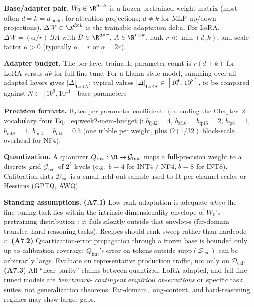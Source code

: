 \begin{notationbox}
\textbf{Base/adapter pair.}
$W_0 \in \R^{d \times k}$ is a frozen pretrained weight matrix (most
often $d = k = d_{\mathrm{model}}$ for attention projections; $d \ne
k$ for MLP up/down projections). $\Delta W \in \R^{d \times k}$ is
the trainable adaptation delta. For LoRA,
$\Delta W = (\alpha/r)\,B A$ with $B \in \R^{d \times r}$,
$A \in \R^{r \times k}$, rank $r \ll \min(d,k)$, and scale factor
$\alpha > 0$ (typically $\alpha = r$ or $\alpha = 2r$).

\textbf{Adapter budget.}
The per-layer trainable parameter count is $r(d+k)$ for LoRA versus
$dk$ for full fine-tune. For a Llama-style model, summing over all
adapted layers gives $|\Delta|_{\mathrm{LoRA}}$; typical values
$|\Delta|_{\mathrm{LoRA}} \in [10^{6}, 10^{8}]$, to be compared
against $N \in [10^{9}, 10^{11}]$ base parameters.

\textbf{Precision formats.}
Bytes-per-parameter coefficients (extending the Chapter~2 vocabulary
from Eq.~\eqref{eq:week2-mem-budget}): $b_{\mathrm{fp32}} = 4$,
$b_{\mathrm{bf16}} = b_{\mathrm{fp16}} = 2$, $b_{\mathrm{fp8}} = 1$,
$b_{\mathrm{int8}} = 1$, $b_{\mathrm{int4}} = b_{\mathrm{nf4}} = 0.5$
(one nibble per weight, plus $O(1/32)$ block-scale overhead for NF4).

\textbf{Quantization.}
A quantizer $Q_{\mathrm{fmt}} : \R \to \mathcal{G}_{\mathrm{fmt}}$
maps a full-precision weight to a discrete grid
$\mathcal{G}_{\mathrm{fmt}}$ of $2^{b}$ levels (e.g.\ $b=4$ for INT4
/ NF4, $b=8$ for INT8). Calibration data $\mathcal{D}_{\mathrm{cal}}$
is a small held-out sample used to fit per-channel scales or
Hessians (GPTQ, AWQ).

\textbf{Standing assumptions.}
\textbf{(A7.1)} Low-rank adaptation is adequate \emph{when} the
fine-tuning task lies within the intrinsic-dimensionality envelope
of $W_0$'s pretraining distribution~\citep{aghajanyan2021intrinsic};
it fails silently outside that envelope (far-domain transfer,
hard-reasoning tasks). Recipes should rank-sweep rather than hardcode
$r$.
\textbf{(A7.2)} Quantization-error propagation through a frozen base
is bounded only up to calibration coverage:
$Q_{\mathrm{fmt}}$'s error on tokens outside
$\mathrm{supp}(\mathcal{D}_{\mathrm{cal}})$ can be arbitrarily large.
Evaluate on representative production traffic, not only on
$\mathcal{D}_{\mathrm{cal}}$.
\textbf{(A7.3)} All ``near-parity'' claims between quantized,
LoRA-adapted, and full-fine-tuned models are \emph{benchmark-
contingent empirical observations} on specific task suites, not
generalization theorems. Far-domain, long-context, and hard-reasoning
regimes may show larger gaps.
\end{notationbox}

